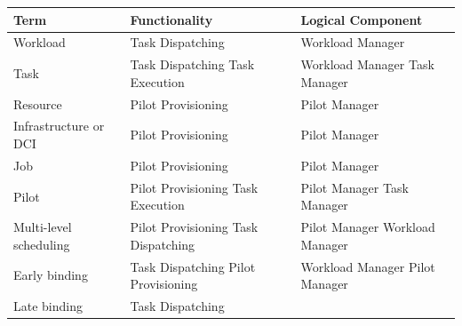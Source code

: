 \documentclass{sig-alternate}
\begin{document}

\begin{table}
 \centering
 \begin{tabular}{|p{4cm}|p{3.2cm}|p{3.2cm}|}
  \hline
    \textbf{Term} &
    \textbf{Functionality} &
    \textbf{Logical Component} \\
  \hline
  \hline
    \textcolor{term}{Workload} &
    \textcolor{funct}{Task Dispatching} &
    \textcolor{lcomp}{Workload Manager} \\
  \hline
    \textcolor{term}{Task} &
    \textcolor{funct}{Task Dispatching} \newline
      \textcolor{funct}{Task Execution} &
    \textcolor{lcomp}{Workload Manager} \newline
      \textcolor{lcomp}{Task Manager} \\
  \hline
    \textcolor{term}{Resource} &
    \textcolor{funct}{Pilot Provisioning} &
    \textcolor{lcomp}{Pilot Manager} \\
  \hline
    \textcolor{term}{Infrastructure} or \textcolor{term}{DCI} &
    \textcolor{funct}{Pilot Provisioning} &
    \textcolor{lcomp}{Pilot Manager} \\
  \hline
    \textcolor{term}{Job} &
    \textcolor{funct}{Pilot Provisioning} &
    \textcolor{lcomp}{Pilot Manager} \\
  \hline
    \textcolor{term}{Pilot} &
    \textcolor{funct}{Pilot Provisioning} \newline
      \textcolor{funct}{Task Execution} &
    \textcolor{lcomp}{Pilot Manager} \newline
      \textcolor{lcomp}{Task Manager} \\
  \hline
    \textcolor{term}{Multi-level scheduling} &
    \textcolor{funct}{Pilot Provisioning} \newline
      \textcolor{funct}{Task Dispatching} &
    \textcolor{lcomp}{Pilot Manager} \newline
      \textcolor{lcomp}{Workload Manager} \\
  \hline
    \textcolor{term}{Early binding} &
    \textcolor{funct}{Task Dispatching} \newline
      \textcolor{funct}{Pilot Provisioning} &
    \textcolor{lcomp}{Workload Manager} \newline
      \textcolor{lcomp}{Pilot Manager} \\
  \hline
    \textcolor{term}{Late binding} &
    \textcolor{funct}{Task Dispatching} \newline

\end{tabular}
\end{table}
\end{document}
